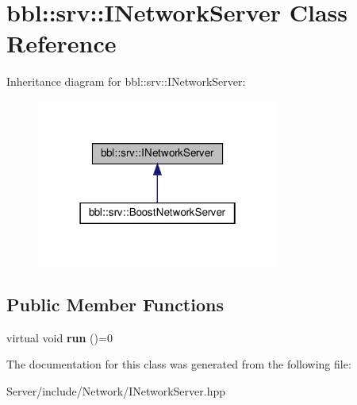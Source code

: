 \hypertarget{classbbl_1_1srv_1_1_i_network_server}{}\section{bbl\+:\+:srv\+:\+:I\+Network\+Server Class Reference}
\label{classbbl_1_1srv_1_1_i_network_server}


Inheritance diagram for bbl\+:\+:srv\+:\+:I\+Network\+Server\+:
\nopagebreak
\begin{figure}[H]
\begin{center}
\leavevmode
\includegraphics[width=226pt]{classbbl_1_1srv_1_1_i_network_server__inherit__graph}
\end{center}
\end{figure}
\subsection*{Public Member Functions}
\begin{DoxyCompactItemize}
\item 
\mbox{\label{classbbl_1_1srv_1_1_i_network_server_a6d7c457c97a68f96e3d43840fbd96d12}} 
virtual void {\bfseries run} ()=0
\end{DoxyCompactItemize}


The documentation for this class was generated from the following file\+:\begin{DoxyCompactItemize}
\item 
Server/include/\+Network/I\+Network\+Server.\+hpp\end{DoxyCompactItemize}
